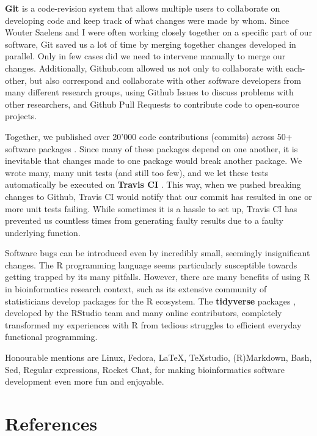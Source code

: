 \textbf{Git} \cite{torvalds_gitfastversion_2005} is a code-revision system that allows multiple users to collaborate on developing code and keep track of what changes were made by whom. 
Since Wouter Saelens and I were often working closely together on a specific part of our software, Git saved us a lot of time by merging together changes developed in parallel. Only in few cases did we need to intervene manually to merge our changes.
Additionally, Github.com allowed us not only to collaborate with each-other, but also correspond and collaborate with other software developers from many different research groups, using Github Issues to discuss problems with other researchers, and Github Pull Requests to contribute code to open-source projects. 

Together, we published over 20'000 code contributions (commits) across 50+ software packages \cite{cannoodt_developmentdynverse_2019}. Since many of these packages depend on one another, it is inevitable that changes made to one package would break another package. We wrote many, many unit tests (and still too few), and we let these tests automatically be executed on \textbf{Travis CI} \cite{traviscigmbh_traviscitest_2011}. This way, when we pushed breaking changes to Github, Travis CI would notify that our commit has resulted in one or more unit tests failing. While sometimes it is a hassle to set up, Travis CI has prevented us countless times from generating faulty results due to a faulty underlying function.

Software bugs can be introduced even by incredibly small, seemingly insignificant changes. The R programming language seems particularly susceptible towards getting trapped by its many pitfalls. However, there are many benefits of using R in bioinformatics research context, such as its extensive community of statisticians develop packages for the R ecosystem. The \textbf{tidyverse} packages \cite{wickham_welcometidyverse_2019}, developed by the RStudio team and many online contributors, completely transformed my experiences with R from tedious struggles to efficient everyday functional programming.

Honourable mentions are Linux, Fedora, \LaTeX, TeXstudio, (R)Markdown, Bash, Sed, Regular expressions, Rocket Chat, for making bioinformatics software development even more fun and enjoyable.

\clearpage
\section{References}
\printbibliography[heading=none]
